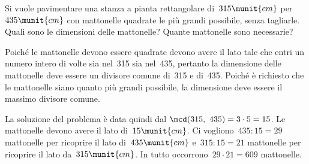 \begin{esempio}{}{}
Si vuole pavimentare una stanza a pianta rettangolare di~\(315\munit{cm}\) 
per~\(435\munit{cm}\) con mattonelle quadrate le più grandi possibile, 
senza tagliarle. 
Quali sono le dimensioni delle  mattonelle? 
Quante mattonelle sono necessarie?

Poiché le mattonelle devono essere quadrate devono avere il lato tale che 
entri un numero intero di volte sia nel~315 sia nel~435, pertanto la 
dimensione delle mattonelle deve essere un divisore comune
di~315 e di~435. Poiché è richiesto che le mattonelle siano quanto più 
grandi possibile, la dimensione deve essere il massimo divisore comune.

\begin{center}
\hspace*{-11mm}
{\esematt}
\end{center}

{}

La soluzione del problema è data quindi dal 
\(\mcd(315,~435)=3 \cdot 5=15\). 
Le mattonelle devono avere il lato di~\(15\munit{cm}\).
Ci vogliono~\(435:15=29\) mattonelle per ricoprire il lato 
di~\(435\munit{cm}\) e~\(315:15=21\) mattonelle per ricoprire il lato
da~\(315\munit{cm}\). In tutto occorrono~\(29 \cdot 21 = 609\) mattonelle.
\end{esempio}


